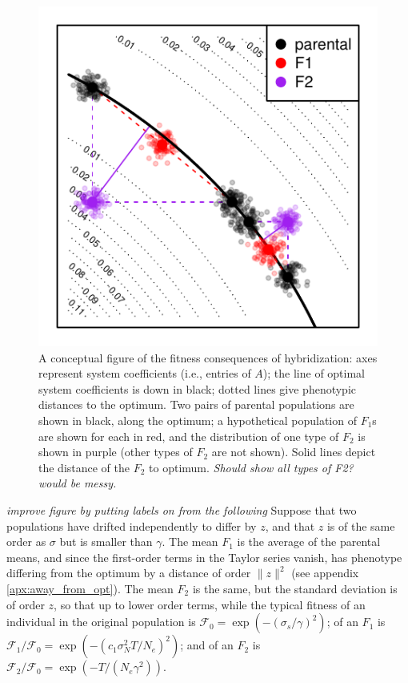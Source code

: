 \documentclass{article}
\newcommand{\plr}[1]{\todo[color=blue!25]{#1}}
\newcommand{\plri}[1]{{\color{blue}\it #1}}
\newcommand{\plr}[1]{{\color{blue}\it #1}}
\newcommand{\plri}[1]{\plr{#1}}
\newcommand{\1}{\mathbbm{1}}
\newcommand{\fit}{\mathcal{F}}
\begin{document}
\begin{figure}
\centering
\includegraphics{figures/conceptual_fig}
\caption{
    \label{fig:conceptual_fig}
    A conceptual figure of the fitness consequences of hybridization:
    axes represent system coefficients (i.e., entries of $A$);
    the line of optimal system coefficients is down in black;
    dotted lines give phenotypic distances to the optimum.
    Two pairs of parental populations are shown in black, along the optimum;
    a hypothetical population of $F_1$s are shown for each in red,
    and the distribution of one type of $F_2$ is shown in purple
    (other types of $F_2$ are not shown).
    Solid lines depict the distance of the $F_2$ to optimum.
    \plri{Should show all types of F2? would be messy.}
}
\end{figure}

\plri{improve figure by putting labels on from the following}
Suppose that two populations have drifted independently to differ by $z$,
and that $z$ is of the same order as $\sigma$ but is smaller than $\gamma$.
The mean $F_1$ is the average of the parental means,
and since the first-order terms in the Taylor series vanish,
has phenotype differing from the optimum by a distance of order $\|z\|^2$ 
(see appendix \ref{apx:away_from_opt}).
The mean $F_2$ is the same,
but the standard deviation is of order $z$,
so that up to lower order terms, 
while the typical fitness of an individual in the original population is
$\fit_0 = \exp(-(\sigma_s/\gamma)^2)$;
of an $F_1$ is
$\fit_1/\fit_0 = \exp(-(c_1 \sigma_N^2 T/N_e)^2)$;
and of an $F_2$ is
$\fit_2/\fit_0 = \exp(- T/(N_e\gamma^2))$.
\end{document}
